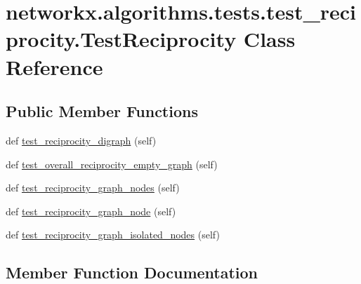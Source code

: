 \hypertarget{classnetworkx_1_1algorithms_1_1tests_1_1test__reciprocity_1_1TestReciprocity}{}\section{networkx.\+algorithms.\+tests.\+test\+\_\+reciprocity.\+Test\+Reciprocity Class Reference}
\label{classnetworkx_1_1algorithms_1_1tests_1_1test__reciprocity_1_1TestReciprocity}
\subsection*{Public Member Functions}
\begin{DoxyCompactItemize}
\item 
def \hyperlink{classnetworkx_1_1algorithms_1_1tests_1_1test__reciprocity_1_1TestReciprocity_a608892835d1c48fd45fb4d8da0dd588a}{test\+\_\+reciprocity\+\_\+digraph} (self)
\item 
def \hyperlink{classnetworkx_1_1algorithms_1_1tests_1_1test__reciprocity_1_1TestReciprocity_a79ab0061e1e30174ee4b06b5cdd22af5}{test\+\_\+overall\+\_\+reciprocity\+\_\+empty\+\_\+graph} (self)
\item 
def \hyperlink{classnetworkx_1_1algorithms_1_1tests_1_1test__reciprocity_1_1TestReciprocity_ac4ee08c4c3f87c984686cd59f37fb67f}{test\+\_\+reciprocity\+\_\+graph\+\_\+nodes} (self)
\item 
def \hyperlink{classnetworkx_1_1algorithms_1_1tests_1_1test__reciprocity_1_1TestReciprocity_aa02abed190188a9cc53fc903926a0601}{test\+\_\+reciprocity\+\_\+graph\+\_\+node} (self)
\item 
def \hyperlink{classnetworkx_1_1algorithms_1_1tests_1_1test__reciprocity_1_1TestReciprocity_a9628d6509496f26689e7ed69a4482895}{test\+\_\+reciprocity\+\_\+graph\+\_\+isolated\+\_\+nodes} (self)
\end{DoxyCompactItemize}


\subsection{Member Function Documentation}
\mbox{\label{classnetworkx_1_1algorithms_1_1tests_1_1test__reciprocity_1_1TestReciprocity_a79ab0061e1e30174ee4b06b5cdd22af5}} 
